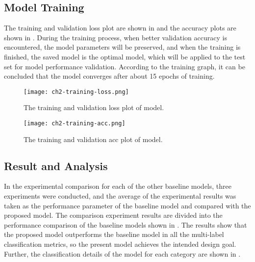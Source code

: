 \subsection{Model Training}
The training and validation loss plot are shown in \figname{\ref{fig:ch2-training-loss}} and the accuracy plots are shown in \figname{\ref{fig:ch2-training-acc}}. During the training process, when better validation accuracy is encountered, the model parameters will be preserved, and when the training is finished, the saved model is the optimal model, which will be applied to the test set for model performance validation. According to the training graph, it can be concluded that the model converges after about 15 epochs of training.
\begin{figure}[htb]
    \centering
    \texttt{[image: ch2-training-loss.png]}
    \caption{The training and validation loss plot of model.}\label{fig:ch2-training-loss}
\end{figure}

\begin{figure}[htb]
    \centering
    \texttt{[image: ch2-training-acc.png]}
    \caption{The training and validation acc plot of model.}\label{fig:ch2-training-acc}
\end{figure}

\subsection{Result and Analysis}
In the experimental comparison for each of the other baseline models, three experiments were conducted, and the average of the experimental results was taken as the performance parameter of the baseline model and compared with the proposed model. The comparison experiment results are divided into the performance comparison of the baseline models shown in \tblname{\ref{tbl:ch2-result-bsline1}}. The results show that the proposed model outperforms the baseline model in all the multi-label classification metrics, so the present model achieves the intended design goal. Further, the classification details of the model for each category are shown in \tblname{\ref{tbl:ch2-result-detail}}.

